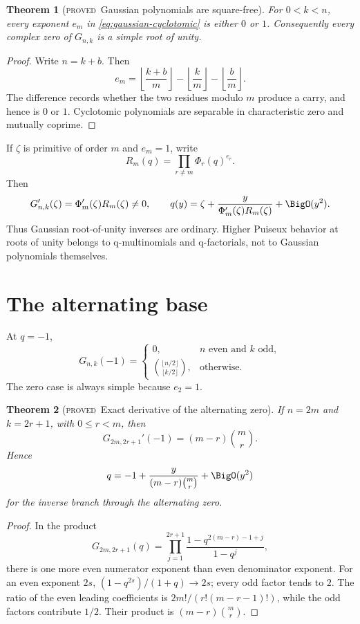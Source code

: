 \documentclass[11pt,letterpaper,oneside,openany]{book}
\newtheorem{theorem}{Theorem}[chapter]
\theoremstyle{definition}
\theoremstyle{remark}
\newcommand{\statusproved}{\textcolor{provedgreen}{\textsc{proved}}}
\begin{document}
\begin{theorem}[\statusproved\ Gaussian polynomials are square-free]
For \(0<k<n\), every exponent \(e_m\) in
\cref{eq:gaussian-cyclotomic} is either \(0\) or \(1\).  Consequently every
complex zero of \(G_{n,k}\) is a simple root of unity.
\end{theorem}
\begin{proof}
Write \(n=k+b\).  Then
\[
 e_m=\left\lfloor\frac{k+b}m\right\rfloor
 -\left\lfloor\frac km\right\rfloor
 -\left\lfloor\frac bm\right\rfloor.
\]
The difference records whether the two residues modulo \(m\) produce a carry,
and hence is \(0\) or \(1\).  Cyclotomic polynomials are separable in
characteristic zero and mutually coprime.
\end{proof}

If \(\zeta\) is primitive of order \(m\) and \(e_m=1\), write
\[
 R_m(q)=\prod_{r\ne m}\Phi_r(q)^{e_r}.
\]
Then
\begin{equation}
 G_{n,k}'(\zeta)=\Phi_m'(\zeta)R_m(\zeta)\ne0,
 \qquad
 q(y)=\zeta+\frac{y}{\Phi_m'(\zeta)R_m(\zeta)}+\BigO(y^2).
 \label{eq:gaussian-root-inverse}
\end{equation}
Thus Gaussian root-of-unity inverses are ordinary.  Higher Puiseux behavior at
roots of unity belongs to q-multinomials and q-factorials, not to Gaussian
polynomials themselves.

\section{The alternating base}
At \(q=-1\),
\begin{equation}
 G_{n,k}(-1)=
 \begin{cases}
 0,&n\text{ even and }k\text{ odd},\\[0.25em]
 \displaystyle\binom{\lfloor n/2\rfloor}{\lfloor k/2\rfloor},&\text{otherwise}.
 \end{cases}
 \label{eq:gaussian-minus-one-value}
\end{equation}
The zero case is always simple because \(e_2=1\).

\begin{theorem}[\statusproved\ Exact derivative of the alternating zero]
If \(n=2m\) and \(k=2r+1\), with \(0\le r<m\), then
\begin{equation}
 G_{2m,2r+1}'(-1)=(m-r)\binom mr.
 \label{eq:gaussian-minus-one-derivative}
\end{equation}
Hence
\[
 q=-1+\frac{y}{(m-r)\binom mr}+\BigO(y^2)
\]
for the inverse branch through the alternating zero.
\end{theorem}
\begin{proof}
In the product
\[
 G_{2m,2r+1}(q)=\prod_{j=1}^{2r+1}
 \frac{1-q^{2(m-r)-1+j}}{1-q^j},
\]
there is one more even numerator exponent than even denominator exponent.
For an even exponent \(2s\),
\((1-q^{2s})/(1+q)\to2s\); every odd factor tends to \(2\).  The ratio of the
even leading coefficients is
\(2m!/(r!(m-r-1)!)\), while the odd factors contribute \(1/2\).  Their product
is \((m-r)\binom mr\).
\end{proof}
\end{document}
